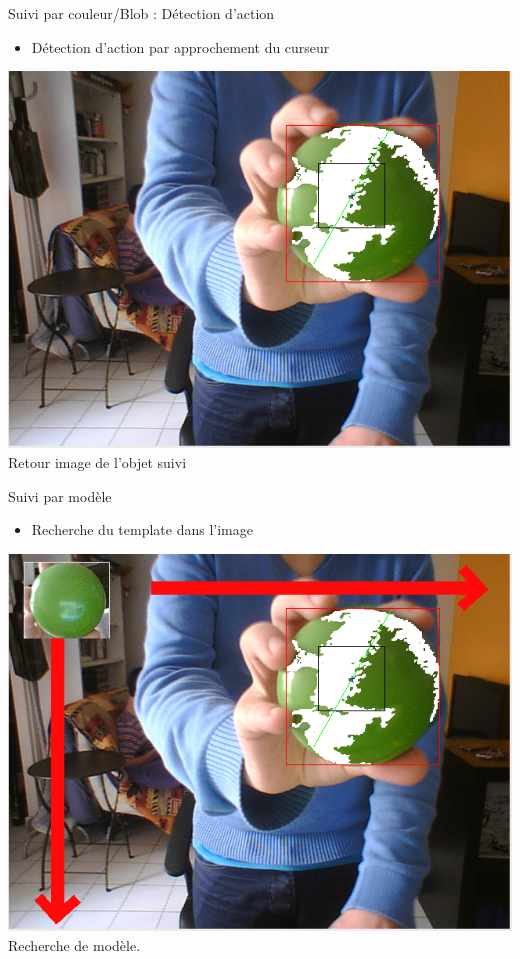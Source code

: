 \documentclass{beamer}
\begin{document}
            \begin{frame}{Suivi par couleur/Blob : Détection d'action}
                  \begin{itemize}
                        \item{Détection d'action par approchement du curseur}
                  \end{itemize}
                  \begin{center}
                        \includegraphics[scale=0.25]{Capture3.png}\\
                        Retour image de l'objet suivi
                  \end{center}
            \end{frame}

            \begin{frame}{Suivi par modèle}
                  \begin{itemize}
                        \item{Recherche du template dans l'image}
                  \end{itemize}
		  \begin{center}
                        \includegraphics[scale=0.25]{Capture8.png}\\
                        Recherche de modèle.
                  \end{center}
            \end{frame}
            
\end{document}

